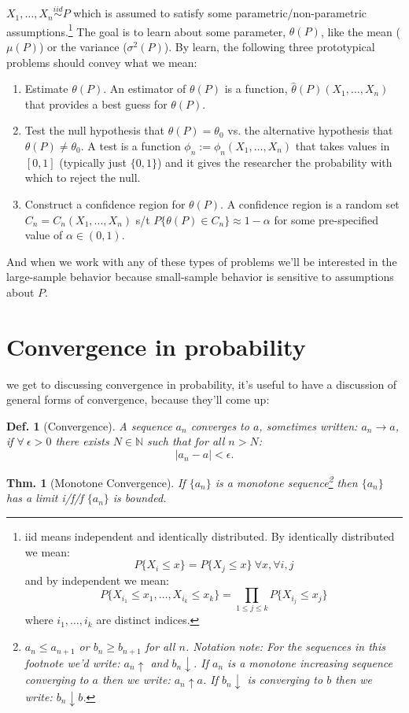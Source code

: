 \documentclass{tufte-book}
\theoremstyle{mytheoremstyle}
\newtheorem*{thm}{Thm.}
\theoremstyle{mylemstyle}
\theoremstyle{mydefstyle}
\newtheorem*{mydef}{Def.}
\begin{document}
 \(X_1, \dots, X_n \overset{iid}{\sim} P\) which is assumed to satisfy some parametric/non-parametric assumptions.\footnote{iid means independent and identically distributed. By identically distributed we mean:
	\[P\{X_i \le x\} = P\{X_j \le x\}\ \forall x, \forall i, j\]
and by independent we mean:
	\[P\{X_{i_1} \le x_1, \dots, X_{i_k} \le x_k\} = \prod_{1 \le j \le k} P\{X_{i_j} \le x_j\}\]
where \(i_1, \dots, i_k\) are distinct indices.} The goal is to learn about some parameter, \(\theta(P)\), like the mean (\(\mu(P)\)) or the variance (\(\sigma^2(P)\)). By learn, the following three prototypical problems should convey what we mean:
\begin{enumerate}
	\item Estimate \(\theta(P)\). An estimator of \(\theta(P)\) is a function, \(\hat{\theta}(P)(X_1, \dots, X_n)\) that provides a best guess for \(\theta(P)\). 
	\item Test the null hypothesis that \(\theta(P) = \theta_0\) vs. the alternative hypothesis that \(\theta(P) \ne \theta_0\). A test is a function \(\phi_n := \phi_n(X_1, \dots, X_n)\) that takes values in \([0, 1]\) (typically just \(\{0, 1\}\)) and it gives the researcher the probability with which to reject the null. 
	\item Construct a confidence region for \(\theta(P)\). A confidence region is a random set \(C_n = C_n(X_1, \dots, X_n)\) s/t \(P\{\theta(P) \in C_n\} \approx 1-\alpha\) for some pre-specified value of \(\alpha \in (0, 1)\).
\end{enumerate}
And when we work with any of these types of problems we'll be interested in the large-sample behavior because small-sample behavior is sensitive to assumptions about \(P\). 

\section{Convergence in probability} 
 we get to discussing convergence in probability, it's useful to have a discussion of general forms of convergence, because they'll come up:
\begin{mydef}[Convergence] A sequence \(a_n\) converges to \(a\), sometimes written: \(a_n \rightarrow a\), if  \(\forall\ \epsilon > 0\) there exists \(N \in \mathbb{N}\) such that for all \(n > N\):
	\[|a_n - a| < \epsilon \text{.}\]
\end{mydef}

\begin{thm}[Monotone Convergence]
	If \(\{a_n\}\) is a monotone sequence\footnote{\(a_n \le a_{n+1}\) or \(b_n \ge b_{n+1}\) for all \(n\). Notation note: For the sequences in this footnote we'd write: \(a_n \uparrow\) and \(b_n \downarrow\). If \(a_n\) is a monotone increasing sequence converging to \(a\) then we write: \(a_n \uparrow a\). If \(b_n \downarrow\) is converging to \(b\) then we write: \(b_n \downarrow b\).} then \(\{a_n\}\) has a limit i/f/f \(\{a_n\}\) is bounded.
\end{thm}
\end{document}
